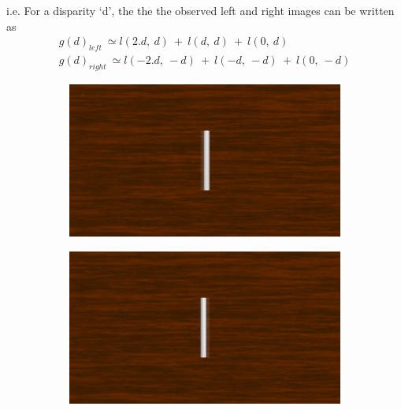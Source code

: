 i.e. For a disparity `d', the the the observed left and right images can be written as
\begin{equation}
\begin{aligned}
g(d)_{left} \: \simeq l(2.d,\:d)\:+\: l(d,\:d)\:+\:l(0,\:d) \\
g(d)_{right} \: \simeq l(-2.d,\:-d)\:+\: l(-d,\:-d)\:+\:l(0,\:-d)
\end{aligned}
\label{eq:auto_obs_imgs}
\end{equation}
\begin{figure}[htbp]
    \begin{subfigure}[b]{0.5\textwidth}
        \includegraphics[width=\textwidth]{./Template_Figures/stereo_ghost_left}
        \caption{}\label{fig:obs_st_left}
    \end{subfigure}
    \begin{subfigure}[b]{0.5\textwidth}
        \includegraphics[width=\textwidth]{./Template_Figures/stereo_ghost_right}
        \caption{}\label{fig:obs_st_right}
    \end{subfigure}


\end{figure}
